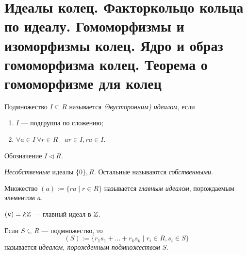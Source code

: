 \section{Идеалы колец. Факторкольцо кольца по идеалу. Гомоморфизмы и изоморфизмы колец. Ядро и образ гомоморфизма колец. Теорема о гомоморфизме для колец}

\begin{definition}
    Подмножество $I \subseteq R$ называется \textit{(двусторонним) идеалом}, если
    \begin{enumerate}
    \item $I$ --- подгруппа по сложению;
    \item $\forall a \in I \ \forall r \in R \quad ar \in I, ra \in I$.
    \end{enumerate}

    Обозначение $I \lhd R$.
\end{definition}

\begin{example}
    \textit{Несобственные} идеалы $ \{0\}, R$. Остальные называются \textit{собственными}.
\end{example}

\begin{definition}
    Множество $(a) := \{ra \mid r \in R\}$ называется \textit{главным идеалом}, порождаемым элементом $a$. 
\end{definition}

\begin{example}
    $(k) = k\mathbb{Z}$ --- главный идеал в $\mathbb{Z}$.
\end{example}

\begin{comment}~\\
    \begin{math}
        \begin{aligned}[t]
            &(a) = R \iff a \text{ обратим,} \\
            &(a) = \{0\} \iff a = 0.
        \end{aligned}
    \end{math}
\end{comment}


\begin{definition}
    Если $S \subseteq R$ --- подмножество, то 
    \begin{equation*}
        (S) := \{r_1 s_1 + \dots + r_k s_k \mid r_i \in R, s_i \in S\}
    \end{equation*}
    называется \textit{идеалом, порожденным подмножеством} $S$.
\end{definition}

